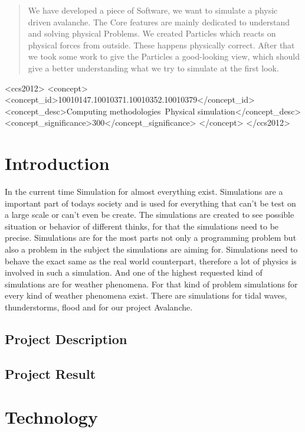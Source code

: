 \documentclass{sig-alternate-05-2015}
\begin{document}
\begin{abstract}
We have developed a piece of Software, we want to simulate a physic driven avalanche. The Core features are mainly dedicated to understand and solving physical Problems. We created Particles which reacts on physical forces from outside. These happens physically correct. After that we took some work to give the Particles a good-looking view, which should give a better understanding what we try to simulate at the first look. \\

\end{abstract}


\begin{CCSXML}
<ccs2012>
<concept>
<concept_id>10010147.10010371.10010352.10010379</concept_id>
<concept_desc>Computing methodologies~Physical simulation</concept_desc>
<concept_significance>300</concept_significance>
</concept>
</ccs2012>
\end{CCSXML}





\section{Introduction}
In the current time Simulation for almost everything exist. Simulations are a important part of todays society and is used for everything that can’t be test on a large scale or can’t even be create. The simulations are created to see possible situation or behavior of different thinks, for that the simulations need to be precise. Simulations are for the most parts not only a programming problem but also a problem in the subject the simulations are aiming for. Simulations need to behave the exact same as the real world counterpart, therefore a lot of physics is involved in such a simulation. And one of the highest requested kind of simulations are for weather phenomena. For that kind of problem simulations for every kind of weather phenomena exist. There are simulations for tidal waves, thunderstorms, flood and for our project Avalanche.
\subsection{Project Description}
\subsection{Project Result}
\section{Technology}
\end{document}
